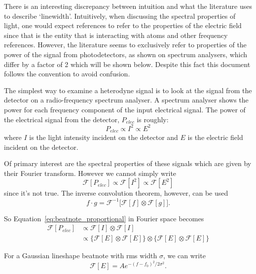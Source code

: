 There is an interesting discrepancy between intuition and what the literature uses to describe `linewidth'.
Intuitively, when discussing the spectral properties of light, one would expect references to refer to the properties of the electric field since that is the entity that is interacting with atoms and other frequency references.
However, the literature seems to exclusively refer to properties of the power of the signal from photodetectors, as shown on spectrum analysers, which differ by a factor of 2 which will be shown below.
Despite this fact this document follows the convention to avoid confusion.

The simplest way to examine a heterodyne signal is to look at the signal from the detector on a radio-frequency spectrum analyser.
A spectrum analyser shows the power for each frequency component of the input electrical signal.
The power of the electrical signal from the detector, $P_{elec}$ is roughly:
\begin{equation}
P_{elec}\propto I^2 \propto E^2
\label{eq:beatnote_proportional}
\end{equation}
where $I$ is the light intensity incident on the detector and $E$ is the electric field incident on the detector.

Of primary interest are the spectral properties of these signals which are given by their Fourier transform.
However we cannot simply write
\begin{equation}
\mathcal{F}[P_{elec}]\propto \mathcal{F}[I^2] \propto \mathcal{F}[E^2]
\end{equation}
since it's not true.
The inverse convolution theorem, however, can be used
\begin{equation}
f\cdot g = \mathcal{F}^{-1} \bigg[ \mathcal{F}[f] \otimes\mathcal{F}[g]\bigg].
\end{equation}

So Equation~\ref{eq:beatnote_proportional} in Fourier space becomes
\begin{align}
\mathcal{F}[P_{elec}]&\propto \mathcal{F}[I]\otimes\mathcal{F}[I]\nonumber\\
&\propto \big\{\mathcal{F}[E] \otimes\mathcal{F}[E]\big\} \otimes\big\{\mathcal{F}[E] \otimes\mathcal{F}[E]\big\}
\end{align}

For a Gaussian lineshape beatnote with \gls{rms} width $\sigma$, we can write
\begin{equation}
\mathcal{F}[E] = A e^{-(f-f_0)^2/2\sigma^2}.
\end{equation}

